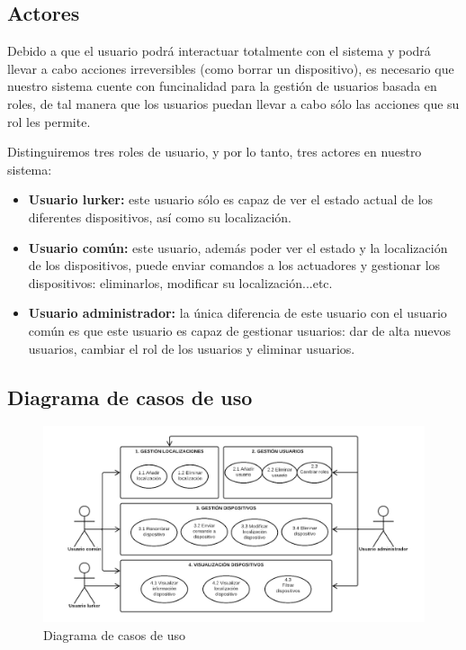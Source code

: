 \subsection{Actores}
Debido a que el usuario podrá interactuar totalmente con el sistema y podrá llevar a cabo acciones irreversibles (como borrar un dispositivo), es necesario
que nuestro sistema cuente con funcinalidad para la gestión de usuarios basada en roles, de tal manera que los usuarios puedan llevar a cabo sólo las acciones
que su rol les permite.
\par
Distinguiremos tres roles de usuario, y por lo tanto, tres actores en nuestro sistema:
\begin{itemize}
\setlength\itemsep{6pt plus 1pt minus 1pt}
\item \textbf{Usuario lurker:} este usuario sólo es capaz de ver el estado actual de los diferentes dispositivos, así como su localización.
\item \textbf{Usuario común:} este usuario, además poder ver el estado y la localización de los dispositivos, puede enviar comandos a los actuadores y gestionar
los dispositivos: eliminarlos, modificar su localización...etc.
\item \textbf{Usuario administrador:} la única diferencia de este usuario con el usuario común es que este usuario es capaz de gestionar usuarios: dar de alta
nuevos usuarios, cambiar el rol de los usuarios y eliminar usuarios.
\end{itemize}
\subsection{Diagrama de casos de uso}

\begin{figure}[H]
\centering
\includegraphics[width=7.00in]{images/casos_uso.png}
\caption{Diagrama de casos de uso}
\label{fig:casos_uso}
\end{figure}

